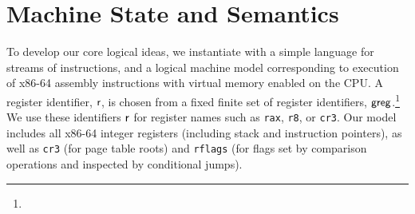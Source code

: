 \section{Machine State and Semantics}
\label{sec:syntax}
To develop our core logical ideas, we instantiate \iris with a simple language for streams of instructions, 
and a logical machine model corresponding to execution of x86-64 assembly instructions with virtual memory enabled on the 
CPU.
%
A register identifier, $\mathsf{r}$, is chosen from a fixed finite set of register identifiers, $\mathsf{greg}$.\footnote{} 
We use these identifiers $\mathsf{r}$ for register names such as \lstinline|rax|, \lstinline|r8|, or \lstinline|cr3|. Our model includes
all x86-64 integer registers (including stack and instruction pointers), as well as \lstinline|cr3| (for page table roots) and \lstinline|rflags| (for
flags set by comparison operations and inspected by conditional jumps).
